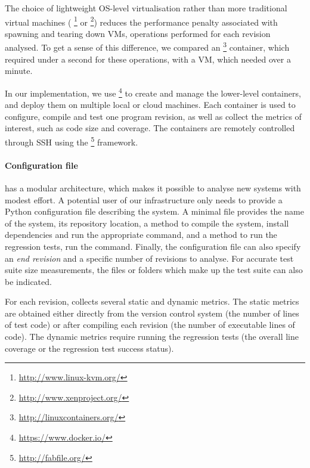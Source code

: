 The choice of lightweight OS-level virtualisation rather than more
traditional virtual machines (\eg
\kvm\footnote{\url{http://www.linux-kvm.org/}} or
\xen\footnote{\url{http://www.xenproject.org/}}) reduces the
performance penalty associated with spawning and tearing down VMs,
operations performed for each revision analysed.  To get a sense of
this difference, we compared an
\lxc\footnote{\url{http://linuxcontainers.org/}} container, which
required under a second for these operations, with a \xen VM, which
needed over a minute.

In our implementation, we use
\docker\footnote{\url{https://www.docker.io/}} to create and manage
the lower-level \lxc containers, and
deploy them on multiple local or cloud machines.
Each container is used to configure, compile and test one
program revision, as well as collect the metrics of interest, such as
code size and coverage. The containers are remotely controlled through
SSH using the \fabric\footnote{\url{http://fabfile.org/}} framework.


\paragraph{Configuration file} \covrig has a modular architecture, which makes it
possible to analyse new systems with modest effort. A potential user
of our infrastructure only needs to provide a Python
configuration file describing the system.  A minimal file provides
the name of the system, its \git repository location, a method to
compile the system, \eg install dependencies and run the appropriate
 command, and a method to run the regression tests, \eg run
the  command.
%
Finally, the configuration file can also specify an {\em end revision}
and a specific number of revisions to analyse.  
For accurate test suite size measurements, the files or folders which
make up the test suite can also be indicated.

For each revision, \covrig collects several static and dynamic metrics.  The
static metrics are obtained either directly from the version control
system (\eg the number of lines of test code) or after compiling each
revision (\eg the number of executable lines of code).  The dynamic
metrics require running the regression tests (\eg the overall line
coverage or the regression test success status).

